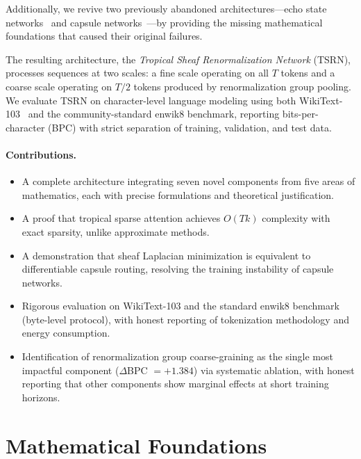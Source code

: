\documentclass[11pt,a4paper]{article}
\begin{document}
\noindent Additionally, we revive two previously abandoned architectures---echo
state networks~\citep{jaeger2001echo} and capsule
networks~\citep{sabour2017dynamic}---by providing the missing
mathematical foundations that caused their original failures.

The resulting architecture, the \emph{Tropical Sheaf Renormalization
Network} (TSRN), processes sequences at two scales: a fine scale
operating on all $T$ tokens and a coarse scale operating on $T/2$
tokens produced by renormalization group pooling.  We evaluate TSRN
on character-level language modeling using both
WikiText-103~\citep{merity2017pointer} and the community-standard
enwik8 benchmark, reporting bits-per-character (BPC) with strict
separation of training, validation, and test data.

\paragraph{Contributions.}
\begin{itemize}[leftmargin=*,nosep]
\item A complete architecture integrating seven novel components from
  five areas of mathematics, each with precise formulations and
  theoretical justification.
\item A proof that tropical sparse attention achieves $O(Tk)$
  complexity with exact sparsity, unlike approximate methods.
\item A demonstration that sheaf Laplacian minimization is equivalent
  to differentiable capsule routing, resolving the training instability
  of capsule networks.
\item Rigorous evaluation on WikiText-103 and the standard enwik8
  benchmark (byte-level protocol), with honest reporting of
  tokenization methodology and energy consumption.
\item Identification of renormalization group coarse-graining as the
  single most impactful component ($\Delta$BPC $= +1.384$) via
  systematic ablation, with honest reporting that other components
  show marginal effects at short training horizons.
\end{itemize}


\section{Mathematical Foundations}
\label{sec:math}
\end{document}
